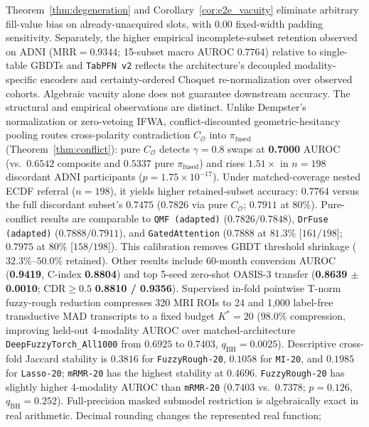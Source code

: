 \documentclass[10pt,twocolumn]{article}
\begin{document}
Theorem~\ref{thm:degeneration} and Corollary~\ref{cor:e2e_vacuity} eliminate arbitrary
fill-value bias on already-unacquired slots, with $0.00$ fixed-width padding sensitivity.
Separately, the higher empirical incomplete-subset retention observed on ADNI
($\text{MRR}=0.9344$; 15-subset macro AUROC $0.7764$) relative to single-table GBDTs and
\texttt{TabPFN~v2} reflects the architecture's decoupled modality-specific encoders and
certainty-ordered Choquet re-normalization over observed cohorts. Algebraic vacuity alone does
not guarantee downstream accuracy. The structural and empirical observations are distinct.
Unlike Dempster's normalization or zero-vetoing IFWA, conflict-discounted
geometric-hesitancy pooling routes cross-polarity contradiction $C_{\mathcal{O}}$ into
$\pi_{\text{fused}}$ (Theorem~\ref{thm:conflict}): pure $C_{\mathcal{O}}$ detects $\gamma=0.8$
swaps at \textbf{0.7000} AUROC (vs.\ $0.6542$ composite and $0.5337$ pure $\pi_{\text{fused}}$)
and rises $1.51\times$ in $n=198$ discordant ADNI participants ($p=1.75\times 10^{-17}$). Under
matched-coverage nested ECDF referral ($n=198$), it yields higher retained-subset accuracy:
$0.7764$ versus the full discordant subset's $0.7475$ ($0.7826$ via pure $C_{\mathcal{O}}$;
$0.7911$ at $80\%$). Pure-conflict results are comparable to \texttt{QMF (adapted)}
($0.7826 / 0.7848$), \texttt{DrFuse (adapted)} ($0.7888 / 0.7911$), and
\texttt{GatedAttention} ($0.7888$ at $81.3\%$ [$161/198$]; $0.7975$ at $80\%$ [$158/198$]).
This calibration removes GBDT threshold shrinkage ($32.3\%$--$50.0\%$ retained). Other
results include 60-month conversion AUROC (\textbf{0.9419},
C-index \textbf{0.8804}) and top 5-seed zero-shot OASIS-3 transfer (\textbf{0.8639 $\pm$
0.0010}; $\text{CDR}\ge 0.5$ \textbf{0.8810 / 0.9356}). Supervised
in-fold pointwise T-norm fuzzy-rough reduction compresses 320 MRI ROIs to 24 and 1,000
label-free transductive MAD transcripts to a fixed budget $K^*=20$ ($98.0\%$ compression,
improving held-out 4-modality AUROC over matched-architecture
\texttt{DeepFuzzyTorch\_All1000} from $0.6925$ to $0.7403$, $q_{\text{BH}}=0.0025$).
Descriptive cross-fold Jaccard stability is $0.3816$ for \texttt{FuzzyRough-20}, $0.1058$
for \texttt{MI-20}, and $0.1985$ for \texttt{Lasso-20}; \texttt{mRMR-20} has the highest
stability at $0.4696$. \texttt{FuzzyRough-20} has slightly higher 4-modality AUROC than
\texttt{mRMR-20} ($0.7403$ vs.\ $0.7378$; $p=0.126$, $q_{\text{BH}}=0.252$).
Full-precision masked submodel restriction is
algebraically exact in real arithmetic. Decimal rounding changes the represented real function;
\end{document}
